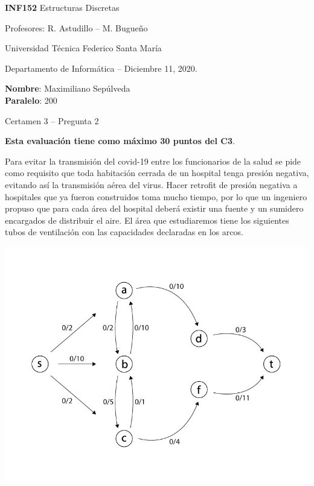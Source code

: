 \documentclass[10pt]{article}
\begin{document}
\thispagestyle{empty}

\begin{minipage}[t]{0.6\textwidth}

{\LARGE \textbf{INF152} Estructuras Discretas}

{\large Profesores: R. Astudillo -- M. Bugueño}

Universidad Técnica Federico Santa María

Departamento de Informática -- Diciembre 11, 2020.

\end{minipage}
\hfill
\begin{minipage}[t]{0.35\textwidth}
\textbf{Nombre}: Maximiliano Sepúlveda\\[0.3cm]
  \textbf{Paralelo}: 200
\end{minipage}

\vspace{0.8cm}

{\Large Certamen 3 -- Pregunta 2}

\vspace{0.4cm}

\textbf{Esta evaluación tiene como máximo 30 puntos del C3}.

\noindent Para evitar la transmisión del covid-19 entre los funcionarios de la salud se pide como requisito que toda habitación cerrada de un hospital
tenga presión negativa, evitando así la transmisión aérea del virus. Hacer retrofit de presión negativa a hospitales que ya fueron construidos toma mucho tiempo, por lo que un ingeniero propuso que para cada área del hospital deberá existir una fuente y un sumidero encargados de distribuir el aire. El área que estudiaremos tiene los siguientes tubos de ventilación con las capacidades declaradas en los arcos.
\begin{center}
  \includegraphics[scale=0.5]{BASE.png}
\end{center}
\end{document}
